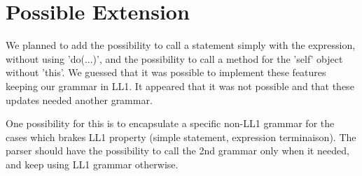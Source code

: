 \section{Possible Extension}

\textnormal{We planned to add the possibility to call a statement simply with
  the expression, without using 'do(...)', and the possibility to call a method
  for the 'self' object without 'this'. We guessed that it was possible to
  implement these features keeping our grammar in LL1. It appeared that it was
  not possible and that these updates needed another grammar. }

\textnormal{One possibility for this is to encapsulate a specific non-LL1
  grammar for the cases which brakes LL1 property (simple statement, expression
  terminaison). The parser should have the possibility to call the 2nd grammar
  only when it needed, and keep using LL1 grammar otherwise. }
